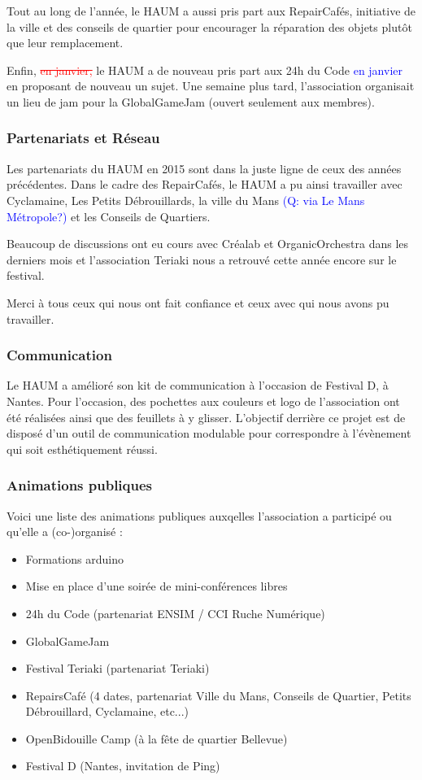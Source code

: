 \documentclass[11pt]{article}
\newcommand{\fs}[1]{\textcolor{red}{\sout{#1}}}
\newcommand{\f}[1]{\textcolor{blue}{#1}}
\begin{document}
Tout au long de l'année, le HAUM a aussi pris part aux RepairCafés, initiative de la ville et des conseils de quartier
pour encourager la réparation des objets plutôt que leur remplacement.

Enfin, \fs{en janvier,} le HAUM a de nouveau pris part aux 24h du Code \f{en janvier} en proposant de nouveau un sujet. Une semaine plus
tard, l'association organisait un lieu de jam pour la GlobalGameJam (ouvert seulement aux membres).

\subsubsection{Partenariats et Réseau}

Les partenariats du HAUM en 2015 sont dans la juste ligne de ceux des années précédentes. Dans le cadre des
RepairCafés, le HAUM a pu ainsi travailler avec Cyclamaine, Les Petits Débrouillards, la ville du Mans \f{(Q: via Le Mans M\'etropole?)}
et les Conseils de Quartiers.

Beaucoup de discussions ont eu cours avec Créalab et OrganicOrchestra dans les derniers mois et l'association Teriaki
nous a retrouvé cette année encore sur le festival.

Merci à tous ceux qui nous ont fait confiance et ceux avec qui nous avons pu travailler.

\subsubsection{Communication}

Le HAUM a amélioré son kit de communication à l'occasion de Festival D, à Nantes. Pour l'occasion, des pochettes aux
couleurs et logo de l'association ont été réalisées ainsi que des feuillets à y glisser. L'objectif derrière ce projet
est de disposé d'un outil de communication modulable pour correspondre à l'évènement qui soit esthétiquement réussi.

\subsubsection{Animations publiques}

Voici une liste des animations publiques auxqelles l'association a participé ou qu'elle a (co-)organisé :

\begin{itemize}
    \item Formations arduino
    \item Mise en place d'une soirée de mini-conférences libres
    \item 24h du Code (partenariat ENSIM / CCI Ruche Numérique)
	\item GlobalGameJam
    \item Festival Teriaki (partenariat Teriaki)
	\item RepairsCafé (4 dates, partenariat Ville du Mans, Conseils de Quartier, Petits Débrouillard, Cyclamaine, etc...)
	\item OpenBidouille Camp (à la fête de quartier Bellevue)
	\item Festival D (Nantes, invitation de Ping)
\end{itemize}
\end{document}
